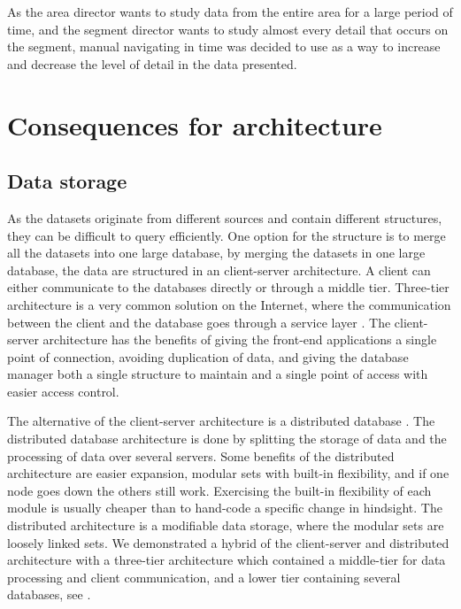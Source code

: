 As the area director wants to study data from the entire area for a large 
period of time, and the segment director wants to study almost every detail 
that occurs on the segment, manual navigating in time was decided to use as a 
way to increase and decrease the level of detail in the data presented.



\section{Consequences for architecture} %
\label{sec:consequences_for_architecture}
\subsection{Data storage} %
\label{sub:data_storage}
As the datasets originate from different sources and contain different
structures, they can be difficult to query efficiently. One option for the structure is to merge all the
datasets into one large database, by merging the datasets in one large
database, the data are structured in an client-server architecture. 
A client can either communicate to the databases directly or through a middle
tier. Three-tier architecture is a very common solution on the Internet, where 
the communication between the client and the database goes through a service 
layer \cite[pp. 294-297]{toftHanseMallaugDatabaser}. The client-server 
architecture has the benefits of giving the front-end applications a single 
point of connection, avoiding duplication of data, and giving the database 
manager both a single structure to maintain and a single point of access with 
easier access control.

The alternative of the client-server architecture is a distributed
database \cite[pp. 301-303]{toftHanseMallaugDatabaser}. The distributed database
architecture is done by splitting the storage of data and the processing of
data over several servers. Some benefits of the distributed architecture are 
easier expansion, modular sets with built-in flexibility, and if one node 
goes down the others still work. Exercising the built-in flexibility of each
module is usually cheaper than to hand-code a specific change in hindsight\cite[pp. 117-130]{Bass:2012:SAP:2392670}. The distributed architecture is a 
modifiable data storage, where the modular sets are loosely linked sets. 
We demonstrated a hybrid of the client-server and distributed
architecture \cite[pp. 297-299]{toftHanseMallaugDatabaser} with a three-tier
architecture which contained a middle-tier for data processing and client
communication, and a lower tier containing several databases, see
.

